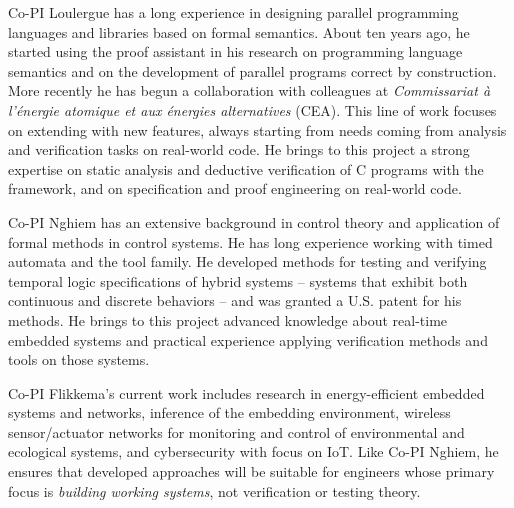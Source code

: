 Co-PI Loulergue has a long experience in designing parallel programming languages and libraries based on formal semantics. About ten years ago, he started using the \Coq proof assistant in his research on programming language semantics and on the development of parallel programs correct by construction. More recently he has begun a collaboration with colleagues at {\it Commissariat \`a l'\'energie atomique et aux \'energies alternatives} (CEA). This line of work focuses on extending \framac with new features, always starting from needs coming from analysis and verification tasks on real-world code. He brings to this project a strong expertise on static analysis and deductive verification of C programs with the \framac framework, and on specification and proof engineering on real-world code. 

Co-PI Nghiem has an extensive background in control theory and application of formal methods in control systems.
He has long experience working with timed automata and the \uppaal tool family.
He developed methods for testing and verifying temporal logic specifications of hybrid systems -- systems that exhibit both continuous and discrete behaviors -- and was granted a U.S. patent for his methods.
He brings to this project advanced knowledge about real-time embedded systems and practical experience applying verification methods and tools on those systems.

Co-PI Flikkema's current work includes research in energy-efficient embedded systems and networks, inference of the embedding environment, wireless sensor/actuator networks for monitoring and control of environmental and ecological systems, and cybersecurity with focus on IoT.  Like Co-PI Nghiem, he ensures that developed approaches will be suitable for engineers whose primary focus is \emph{building working systems}, not verification or testing theory.